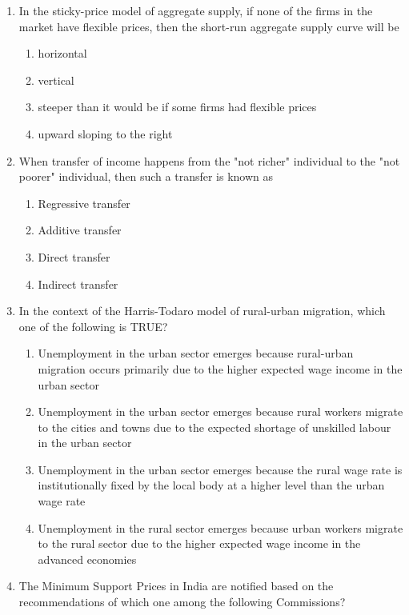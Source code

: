 \documentclass[journal,12pt,onecolumn]{exam}
\theoremstyle{remark}
\begin{document}
\begin{enumerate}
  \item In the sticky-price model of aggregate supply, if none of the firms in the market have flexible prices, then the short-run aggregate supply curve will be

  \begin{enumerate}[label=(\Alph*)]
    \item horizontal
    \item vertical
    \item steeper than it would be if some firms had flexible prices
    \item upward sloping to the right
  \end{enumerate}

\item When transfer of income happens from the "not richer" individual to the "not poorer" individual, then such a transfer is known as

  \begin{enumerate}[label=(\Alph*)]
    \item Regressive transfer
    \item Additive transfer
    \item Direct transfer
    \item Indirect transfer
  \end{enumerate}
\newpage

  \item In the context of the Harris-Todaro model of rural-urban migration, which one of the following is TRUE?

  \begin{enumerate}[label=(\Alph*)]
    \item Unemployment in the urban sector emerges because rural-urban migration occurs primarily due to the higher expected wage income in the urban sector
    \item Unemployment in the urban sector emerges because rural workers migrate to the cities and towns due to the expected shortage of unskilled labour in the urban sector
    \item Unemployment in the urban sector emerges because the rural wage rate is institutionally fixed by the local body at a higher level than the urban wage rate
    \item Unemployment in the rural sector emerges because urban workers migrate to the rural sector due to the higher expected wage income in the advanced economies
  \end{enumerate}


\item The Minimum Support Prices in India are notified based on the recommendations of which one among the following Commissions?


\end{enumerate}
\end{document}
